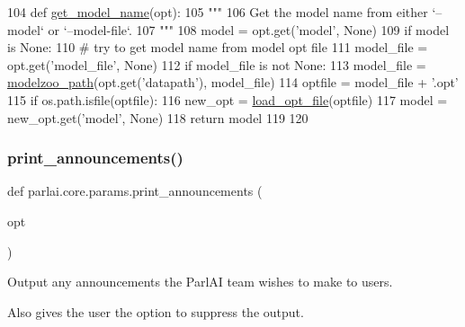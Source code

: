 \begin{DoxyCode}
104 \textcolor{keyword}{def }\hyperlink{namespaceparlai_1_1core_1_1params_a6d160324f6af84562334fd0698141074}{get\_model\_name}(opt):
105     \textcolor{stringliteral}{"""}
106 \textcolor{stringliteral}{    Get the model name from either `--model` or `--model-file`.}
107 \textcolor{stringliteral}{    """}
108     model = opt.get(\textcolor{stringliteral}{'model'}, \textcolor{keywordtype}{None})
109     \textcolor{keywordflow}{if} model \textcolor{keywordflow}{is} \textcolor{keywordtype}{None}:
110         \textcolor{comment}{# try to get model name from model opt file}
111         model\_file = opt.get(\textcolor{stringliteral}{'model\_file'}, \textcolor{keywordtype}{None})
112         \textcolor{keywordflow}{if} model\_file \textcolor{keywordflow}{is} \textcolor{keywordflow}{not} \textcolor{keywordtype}{None}:
113             model\_file = \hyperlink{namespaceparlai_1_1agents_1_1legacy__agents_1_1seq2seq_1_1utils__v0_a5fbd3301b67f00d6d146fb01c7cd7626}{modelzoo\_path}(opt.get(\textcolor{stringliteral}{'datapath'}), model\_file)
114             optfile = model\_file + \textcolor{stringliteral}{'.opt'}
115             \textcolor{keywordflow}{if} os.path.isfile(optfile):
116                 new\_opt = \hyperlink{namespaceparlai_1_1core_1_1opt_a37f4d5498e9174737b7dab37a786c04f}{load\_opt\_file}(optfile)
117                 model = new\_opt.get(\textcolor{stringliteral}{'model'}, \textcolor{keywordtype}{None})
118     \textcolor{keywordflow}{return} model
119 
120 
\end{DoxyCode}
\mbox{\label{namespaceparlai_1_1core_1_1params_afd1a47c94990168ea9e70d894a79bd2c}} 
\subsubsection{\texorpdfstring{print\+\_\+announcements()}{print\_announcements()}}
{\footnotesize\ttfamily def parlai.\+core.\+params.\+print\+\_\+announcements (\begin{DoxyParamCaption}\item[{}]{opt }\end{DoxyParamCaption})}

\begin{DoxyVerb}Output any announcements the ParlAI team wishes to make to users.

Also gives the user the option to suppress the output.
\end{DoxyVerb}
 

